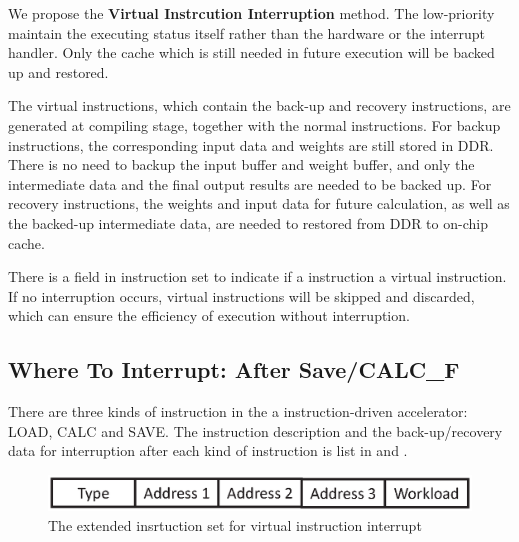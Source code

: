 We propose the \textbf{Virtual Instrcution Interruption} method. The low-priority maintain the executing status itself rather than the hardware or the interrupt handler. Only the cache which is still needed in future execution will be backed up and restored.

The virtual instructions, which contain the back-up and recovery instructions, are generated at compiling stage, together with the normal instructions. For backup instructions, the corresponding input data and weights are still stored in DDR. There is no need to backup the input buffer and weight buffer, and only the intermediate data and the final output results are needed to be backed up. For recovery instructions, the weights and input data for future calculation, as well as the backed-up intermediate data, are needed to restored from DDR to on-chip cache.

There is a field in instruction set to indicate if a instruction a virtual instruction. If no interruption occurs, virtual instructions will be skipped and discarded, which can ensure the efficiency of execution without interruption.

\subsection{ Where To Interrupt: After Save/CALC\_F }
\label{sec:whereinter}

There are three kinds of instruction in the a instruction-driven accelerator: LOAD, CALC and SAVE. The instruction description and the back-up/recovery data for interruption after each kind of instruction is list in  and .

\begin{figure}[h]
	\centering
	\includegraphics[width=0.9\linewidth]{fig/normal_instr.eps}
	\caption{The extended insrtuction set for virtual instruction interrupt }
	\label{fig:normal_instr}
\end{figure}


